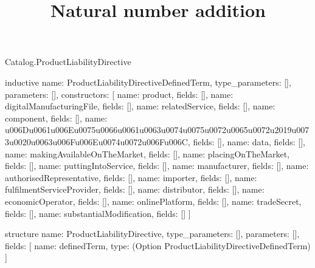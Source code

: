 \begin{lexlean}{Catalog.ProductLiabilityDirective}
\title{Natural number addition}
\begin{semanticmodule}
inductive{
  name: ProductLiabilityDirectiveDefinedTerm,
  type_parameters: [],
  parameters: [],
  constructors: [
    {name: product, fields: []},
    {name: digitalManufacturingFile, fields: []},
    {name: relatedService, fields: []},
    {name: component, fields: []},
    {name: u006Du0061u006Eu0075u0066u0061u0063u0074u0075u0072u0065u0072u2019u0073u0020u0063u006Fu006Eu0074u0072u006Fu006C, fields: []},
    {name: data, fields: []},
    {name: makingAvailableOnTheMarket, fields: []},
    {name: placingOnTheMarket, fields: []},
    {name: puttingIntoService, fields: []},
    {name: manufacturer, fields: []},
    {name: authorisedRepresentative, fields: []},
    {name: importer, fields: []},
    {name: fulfilmentServiceProvider, fields: []},
    {name: distributor, fields: []},
    {name: economicOperator, fields: []},
    {name: onlinePlatform, fields: []},
    {name: tradeSecret, fields: []},
    {name: substantialModification, fields: []}
  ]
}

structure{
  name: ProductLiabilityDirective,
  type_parameters: [],
  parameters: [],
  fields: [
    {name: definedTerm, type: (Option ProductLiabilityDirectiveDefinedTerm)}
  ]
}
\end{semanticmodule}
\end{lexlean}

